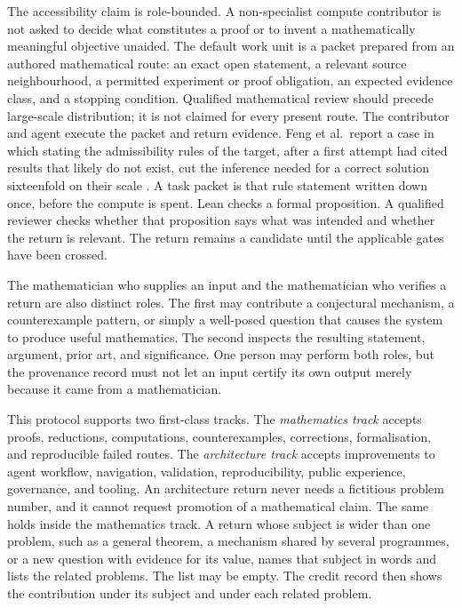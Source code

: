 \documentclass[10pt]{article}
\begin{document}
The accessibility claim is role-bounded.  A non-specialist compute
contributor is not asked to decide what constitutes a proof or to invent a
mathematically meaningful objective unaided.  The default work unit is a
packet prepared from an authored mathematical route: an exact open statement,
a relevant source neighbourhood, a permitted
experiment or proof obligation, an expected evidence class, and a stopping
condition.  Qualified mathematical review should precede large-scale
distribution; it is not claimed for every present route.  The contributor and
agent execute the packet and return evidence.  Feng et al.\ report a case in
which stating the admissibility rules of the target, after a first attempt
had cited results that likely do not exist, cut the inference needed for a
correct solution sixteenfold on their scale \cite{autonomousmath}.  A task
packet is that rule statement written down once, before the compute is
spent.
Lean checks a formal proposition.  A qualified reviewer checks whether that
proposition says what was intended and whether the return is relevant.  The
return remains a candidate until the applicable gates have been crossed.

The mathematician who supplies an input and the mathematician who verifies a
return are also distinct roles.  The first may contribute a conjectural
mechanism, a counterexample pattern, or simply a well-posed question that
causes the system to produce useful mathematics.  The second inspects the
resulting statement, argument, prior art, and significance.  One person may
perform both roles, but the provenance record must not let an input certify
its own output merely because it came from a mathematician.

This protocol supports two first-class tracks.  The \emph{mathematics track}
accepts proofs, reductions, computations, counterexamples, corrections,
formalisation, and reproducible failed routes.  The \emph{architecture track}
accepts improvements to agent workflow, navigation, validation,
reproducibility, public experience, governance, and tooling.  An architecture
return never needs a fictitious problem number, and it cannot request
promotion of a mathematical claim.  The same holds inside the mathematics
track.  A return whose subject is wider than one problem, such as a general
theorem, a mechanism shared by several programmes, or a new question with
evidence for its value, names that subject in words and lists the related
problems.  The list may be empty.  The credit record then shows the
contribution under its subject and under each related problem.
\end{document}
